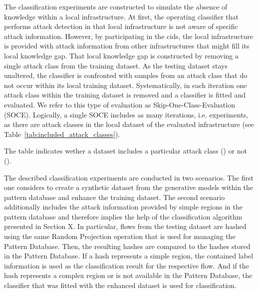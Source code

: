 \documentclass[../../main.tex]{subfiles}
\begin{document}
The classification experiments are constructed to simulate the absence of knowledge within a local infrastructure. At first, the operating classifier that performs attack detection in that local infrastructure is not aware of specific attack information. However, by participating in the \gls{cids}, the local infrastructure is provided with attack information from other infrastructures that might fill its local knowledge gap. That local knowledge gap is constructed by removing a single attack class from the training dataset. As the testing dataset stays unaltered, the classifier is confronted with samples from an attack class that do not occur within its local training dataset. Systematically, in each iteration one attack class within the training dataset is removed and a classifier is fitted and evaluated. We refer to this type of evaluation as Skip-One-Class-Evaluation (SOCE). Logically, a single SOCE includes as many iterations, i.e. experiments, as there are attack classes in the local dataset of the evaluated infrastructure (see Table~\ref{tab:included_attack_classes}).

\begin{table}[H]
    \footnotesize
    \centering
    \setlength{\extrarowheight}{0pt}
    \addtolength{\extrarowheight}{\aboverulesep}
    \addtolength{\extrarowheight}{\belowrulesep}
    \setlength{\aboverulesep}{0pt}
    \setlength{\belowrulesep}{0pt}
    \setlength{\extrarowheight}{.1em}
     
    \caption[Attack classes included in the datasets]{The table indicates wether a dataset includes a particular attack class (\cmark) or not (\xmark).}
    \label{tab:included_attack_classes}
\end{table}

The described classification experiments are conducted in two scenarios. The first one considers to create a synthetic dataset from the generative models within the pattern database and enhance the training dataset. The second scenario additionally includes the attack information provided by simple regions in the pattern database and therefore implies the help of the classification algorithm presented in Section X. In particular, flows from the testing dataset are hashed using the same Random Projection operation that is used for managing the Pattern Database. Then, the resulting hashes are compared to the hashes stored in the Pattern Database. If a hash represents a simple region, the contained label information is used as the classification result for the respective flow. And if the hash represents a complex region or is not available in the Pattern Database, the classifier that was fitted with the enhanced dataset is used for classification. 
\end{document}
